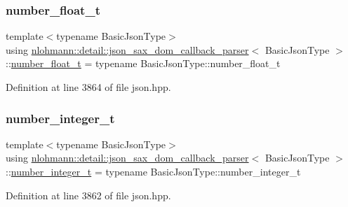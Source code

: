 \subsubsection{\texorpdfstring{number\+\_\+float\+\_\+t}{number\_float\_t}}
{\footnotesize\ttfamily template$<$typename Basic\+Json\+Type$>$ \\
using \hyperlink{classnlohmann_1_1detail_1_1json__sax__dom__callback__parser}{nlohmann\+::detail\+::json\+\_\+sax\+\_\+dom\+\_\+callback\+\_\+parser}$<$ Basic\+Json\+Type $>$\+::\hyperlink{structnlohmann_1_1json__sax_a390c209bffd8c4800c8f3076dc465a20}{number\+\_\+float\+\_\+t} =  typename Basic\+Json\+Type\+::number\+\_\+float\+\_\+t}



Definition at line 3864 of file json.\+hpp.

\mbox{\label{classnlohmann_1_1detail_1_1json__sax__dom__callback__parser_a3ba8fc7a8d83c5b0eeb3b543ad844b8d}} 
\subsubsection{\texorpdfstring{number\+\_\+integer\+\_\+t}{number\_integer\_t}}
{\footnotesize\ttfamily template$<$typename Basic\+Json\+Type$>$ \\
using \hyperlink{classnlohmann_1_1detail_1_1json__sax__dom__callback__parser}{nlohmann\+::detail\+::json\+\_\+sax\+\_\+dom\+\_\+callback\+\_\+parser}$<$ Basic\+Json\+Type $>$\+::\hyperlink{structnlohmann_1_1json__sax_a0cef30121f02b7fee85e9708148ea0aa}{number\+\_\+integer\+\_\+t} =  typename Basic\+Json\+Type\+::number\+\_\+integer\+\_\+t}



Definition at line 3862 of file json.\+hpp.

\mbox{\label{classnlohmann_1_1detail_1_1json__sax__dom__callback__parser_a2406c5125f7128fb9c01921df2903001}} 
